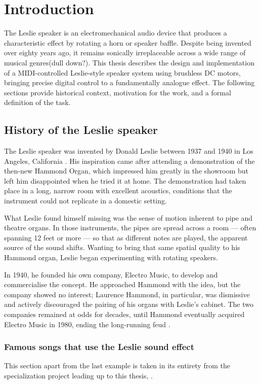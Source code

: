 
\chapter{Introduction}

The Leslie speaker is an electromechanical audio device that produces a characteristic effect by rotating a horn or speaker baffle. Despite being invented over eighty years ago, it remains sonically irreplaceable across a wide range of musical genres(dull down?). This thesis describes the design and implementation of a MIDI-controlled Leslie-style speaker system using brushless DC motors, bringing precise digital control to a fundamentally analogue effect. The following sections provide historical context, motivation for the work, and a formal definition of the task.

\section{History of the Leslie speaker}
The Leslie speaker was invented by Donald Leslie between 1937 and 1940 in Los Angeles, California \cite{vail2002}. His inspiration came after attending a demonstration of the then-new Hammond Organ, which impressed him greatly in the showroom but left him disappointed when he tried it at home. The demonstration had taken place in a long, narrow room with excellent acoustics, conditions that the instrument could not replicate in a domestic setting.

What Leslie found himself missing was the sense of motion inherent to pipe and theatre organs. In those instruments, the pipes are spread across a room --- often spanning 12 feet or more --- so that as different notes are played, the apparent source of the sound shifts. Wanting to bring that same spatial quality to his Hammond organ, Leslie began experimenting with rotating speakers.

In 1940, he founded his own company, Electro Music, to develop and commercialise the concept. He approached Hammond with the idea, but the company showed no interest; Laurence Hammond, in particular, was dismissive and actively discouraged the pairing of his organs with Leslie's cabinet. The two companies remained at odds for decades, until Hammond eventually acquired Electro Music in 1980, ending the long-running feud \citep{motleymoose2015hammondleslie}.

\subsection{Famous songs that use the Leslie sound effect}
This section apart from the last example is taken in its entirety from the specialization project leading up to this thesis, \citep{horpedal2025projectthesis}.

